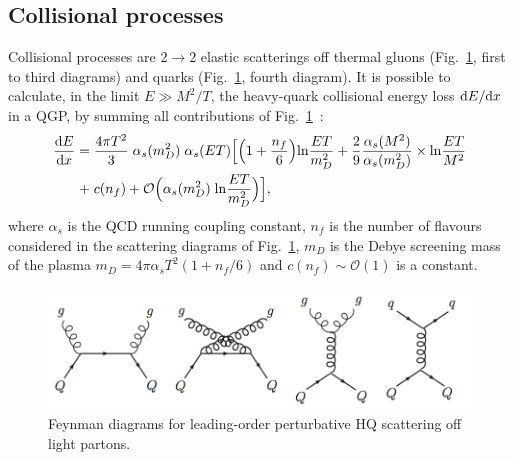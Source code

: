 \subsection{Collisional processes}
\label{sec:coll}
Collisional processes are $2 \rightarrow 2$ elastic scatterings off thermal 
gluons (Fig.~\ref{fig:LoopCollScatt}, first to third diagrams) and quarks 
(Fig.~\ref{fig:LoopCollScatt}, fourth diagram). It is possible to calculate,
 in the limit $E \gg M^2/T$, the heavy-quark collisional energy loss 
 ${\rm d} E/{\rm d} x$ in a QGP, by summing all contributions of 
 Fig.~\ref{fig:LoopCollScatt}~\cite{Peigne:2008nd}:
\begin{equation}
\label{eq:QCDenLossColl}
\begin{split}
\frac{{\rm d} E}{{\rm d} x} = \; & \frac{4 \pi T^2}{3}\;  \alpha_s (m^2_D)\;  \alpha_s(ET) {\Big [} {\Big (}  1 + \frac{n_f}{6}{\Big )} {\rm ln} \frac{ET}{m^2_D} + \frac{2}{9} \frac{\alpha_s(M^2)}{\alpha_s(m^2_D)} \times {\rm ln} \frac{ET}{M^2}  \\+\;  &c(n_f) + \mathcal{O}{\Big (}\alpha_s (m^2_D) \; {\rm ln}\frac{ET}{m^2_D}{\Big )}{\Big ]},
\end{split}
\end{equation}
where $\alpha_s$ is the QCD running coupling constant, $n_f$ is the number of flavours 
considered in the scattering diagrams of Fig.~\ref{fig:LoopCollScatt}, $m_D$ is the 
Debye screening mass of the plasma $m_D = 4\pi \alpha_s T^2 (1 + n_f/6)$ and $c(n_f) \sim \mathcal{O}(1)$ is a constant. 
\begin{figure}[!ht]
  \centering
  \includegraphics[width=14cm]{FigCap2/LO_HQscattering.png}
  \caption{Feynman diagrams for leading-order perturbative HQ scattering off light partons.}
  \label{fig:LoopCollScatt}
\end{figure}

